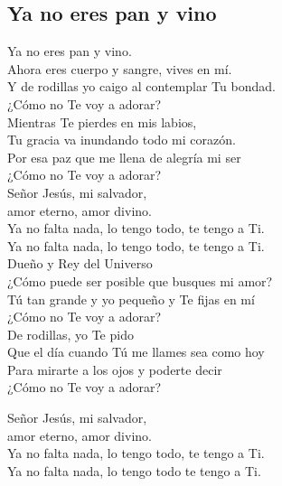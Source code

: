 \subsection{Ya no eres pan y vino}
%
\begin{center}
{\Large
Ya no eres pan y vino.\\
Ahora eres cuerpo y sangre, vives en mí.\\
Y de rodillas yo caigo al contemplar Tu bondad.\\
¿Cómo no Te voy a adorar?\\
\vspace{1em}
Mientras Te pierdes en mis labios,\\
Tu gracia va inundando todo mi corazón.\\
Por esa paz que me llena de alegría mi ser\\
¿Cómo no Te voy a adorar?\\
\vspace{1em}
Señor Jesús, mi salvador,\\
amor eterno, amor divino.\\
Ya no falta nada, lo tengo todo, te tengo a Ti.\\
Ya no falta nada, lo tengo todo, te tengo a Ti.\\
\vspace{1em}
Dueño y Rey del Universo\\
¿Cómo puede ser posible que busques mi amor?\\
Tú tan grande y yo pequeño y Te fijas en mí\\
¿Cómo no Te voy a adorar?\\
\vspace{1em}
De rodillas, yo Te pido\\
Que el día cuando Tú me llames sea como hoy\\
Para mirarte a los ojos y poderte decir\\
¿Cómo no Te voy a adorar?\\
\vspace{1em}

Señor Jesús, mi salvador,\\
amor eterno, amor divino.\\
Ya no falta nada, lo tengo todo, te tengo a Ti.\\
Ya no falta nada, lo tengo todo te tengo a Ti.\\
}
\end{center}